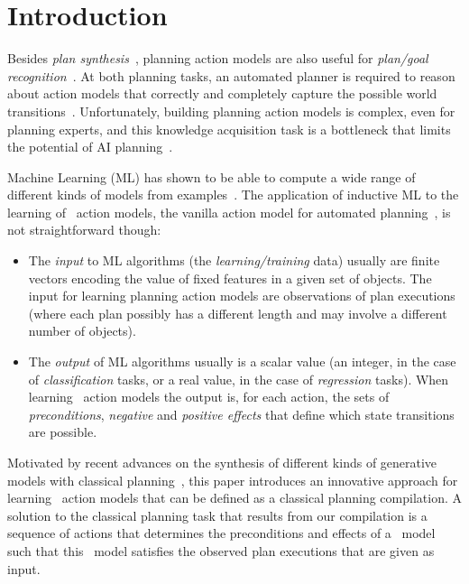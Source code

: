
\section{Introduction}
\label{sec:Section1}

Besides {\em plan synthesis}~\cite{ghallab2004automated}, planning action models are also useful for {\em plan/goal recognition}~\cite{ramirez2012plan}. At both planning tasks, an automated planner is required to reason about action models that correctly and completely capture the possible world transitions~\cite{geffner:book:2013}. Unfortunately, building planning action models is complex, even for planning experts, and this knowledge acquisition task is a bottleneck that limits the potential of AI planning~\cite{kambhampati:modellite:AAAI2007}.

Machine Learning (ML) has shown to be able to compute a wide range of different kinds of models from examples~\cite{michalski2013machine}. The application of inductive ML to the learning of \strips\ action models, the vanilla action model for automated planning~\cite{fikes1971strips}, is not straightforward though:
\begin{itemize}
\item The {\em input} to ML algorithms (the {\em learning/training} data) usually are finite vectors encoding the value of fixed features in a given set of objects. The input for learning planning action models are observations of plan executions (where each plan possibly has a different length and may involve a different number of objects).
\item The {\em output} of ML algorithms usually is a scalar value (an integer, in the case of {\em classification} tasks, or a real value, in the case of {\em regression} tasks). When learning \strips\ action models the output is, for each action, the sets of {\em preconditions}, {\em negative} and {\em positive effects} that define which state transitions are possible.
\end{itemize}

Motivated by recent advances on the synthesis of different kinds of generative models with classical planning~\cite{bonet2009automatic,segovia2016generalized,segovia2016hierarchical,segovia2017generating}, this paper introduces an innovative approach for learning \strips\ action models that can be defined as a classical planning compilation. A solution to the classical planning task that results from our compilation is a sequence of actions that determines the preconditions and effects of a \strips\ model such that this \strips\ model satisfies the observed plan executions that are given as input.

